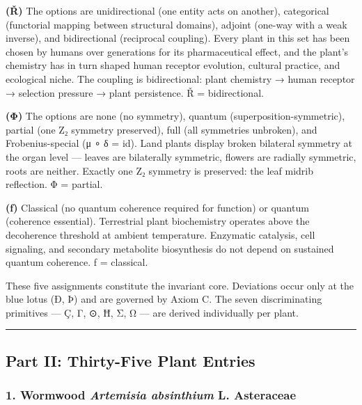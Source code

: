 \textbf{(Ř)} The options are unidirectional (one entity acts on
another), categorical (functorial mapping between structural domains),
adjoint (one-way with a weak inverse), and bidirectional (reciprocal
coupling). Every plant in this set has been chosen by humans over
generations for its pharmaceutical effect, and the plant's chemistry has
in turn shaped human receptor evolution, cultural practice, and
ecological niche. The coupling is bidirectional: plant chemistry → human
receptor → selection pressure → plant persistence. Ř = bidirectional.

\textbf{(Φ)} The options are none (no symmetry), quantum
(superposition-symmetric), partial (one Z₂ symmetry preserved), full
(all symmetries unbroken), and Frobenius-special (μ ∘ δ = id). Land
plants display broken bilateral symmetry at the organ level --- leaves
are bilaterally symmetric, flowers are radially symmetric, roots are
neither. Exactly one Z₂ symmetry is preserved: the leaf midrib
reflection. Φ = partial.

\textbf{(ƒ)} Classical (no quantum coherence required for function) or
quantum (coherence essential). Terrestrial plant biochemistry operates
above the decoherence threshold at ambient temperature. Enzymatic
catalysis, cell signaling, and secondary metabolite biosynthesis do not
depend on sustained quantum coherence. ƒ = classical.

These five assignments constitute the invariant core. Deviations occur
only at the blue lotus (Ð, Þ) and are governed by Axiom C. The seven
discriminating primitives --- Ç, Γ, ⊙, Ħ, Σ, Ω --- are derived
individually per plant.

\begin{center}\rule{0.5\linewidth}{0.5pt}\end{center}

\hypertarget{part-ii-thirty-five-plant-entries}{%
\subsection{Part II: Thirty-Five Plant
Entries}\label{part-ii-thirty-five-plant-entries}}

\hypertarget{wormwood-artemisia-absinthium-l.-asteraceae}{%
\subsubsection{\texorpdfstring{1. Wormwood \textbar{} \emph{Artemisia
absinthium} L. \textbar{}
Asteraceae}{1. Wormwood \textbar{} Artemisia absinthium L. \textbar{} Asteraceae}}\label{wormwood-artemisia-absinthium-l.-asteraceae}}


